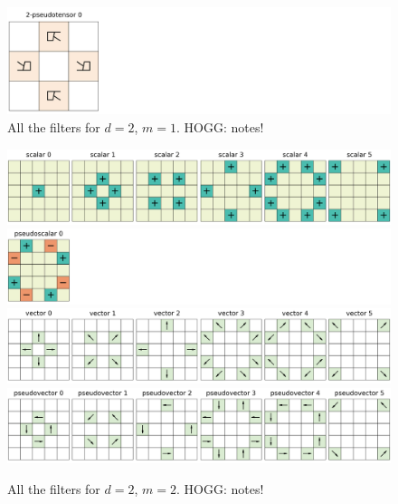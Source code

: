\documentclass{article}
\theoremstyle{plain}
\begin{document}
\begin{figure}[tp]
\begin{mdframed}
\begin{center}
\includegraphics[width=\textwidth]{notebooks/filter-2_2_3.png}
  \end{center}
\caption{All the filters for $d=2$, $m=1$. HOGG: notes!}
  \end{mdframed}
\end{figure}

\begin{figure}[tp]
  \begin{mdframed}
  \color{captiongray}
  \begin{center}
\includegraphics[width=\textwidth]{notebooks/filter+0_2_5.png}\\
\includegraphics[width=\textwidth]{notebooks/filter-0_2_5.png}\\
\includegraphics[width=\textwidth]{notebooks/filter+1_2_5.png}\\
\includegraphics[width=\textwidth]{notebooks/filter-1_2_5.png}
  \end{center}
\caption{All the filters for $d=2$, $m=2$. HOGG: notes!}
  \end{mdframed}
\end{figure}
\end{document}
